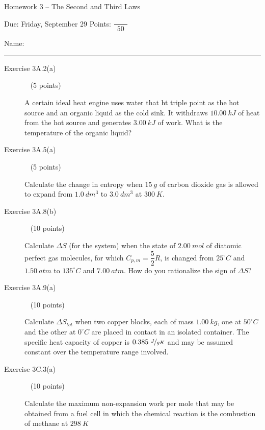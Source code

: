 \documentclass[12pt, openany, letterpaper]{memoir}
\begin{document}
\begin{center}
	{\large Homework 3 -- The Second and Third Laws}
	
	Due: Friday, September 29 \hspace{3em} Points: ${\dfrac{~}{~~50~~}}$
\end{center}

Name: \rule[-.1mm]{15em}{0.1pt}

\begin{description}	
	\item [Exercise 3A.2(a)] ~ (5 points)
	
	A certain ideal heat engine uses water that ht triple point as the hot source and an organic liquid as the cold sink. It withdraws $10.00~kJ$ of heat from the hot source and generates $3.00~kJ$ of work. What is the temperature of the organic liquid?
	
	\vspace{15em}
	\item [Exercise 3A.5(a)] ~ (5 points)
	
	Calculate the change in entropy when $15~g$ of carbon dioxide gas is allowed to expand from $1.0~dm^3$ to $3.0~dm^3$ at $300~K$.
	
	\vspace{15em}\newpage
	\item [Exercise 3A.8(b)] ~ (10 points)
	
	Calculate $\Delta S$ (for the system) when the state of $2.00~mol$ of diatomic perfect gas molecules, for which $C_{p,m}=\dfrac{5}{2}R$, is changed from $25^\circ C$ and $1.50~atm$ to $135^\circ C$ and $7.00~atm$. How do you rationalize the sign of $\Delta S$?
	
	\vspace{21em}

	\item [Exercise 3A.9(a)] ~ (10 points)
	
	Calculate $\Delta S_{tot}$ when two copper blocks, each of mass $1.00~kg$, one at $50^\circ C$ and the other at $0^\circ C$ are placed in contact in an isolated container. The specific heat capacity of copper is $0.385~\nicefrac{J}{gK}$ and may be assumed constant over the temperature range involved.
	
	\vspace{21em}
	
	\item [Exercise 3C.3(a)] ~ (10 points)
	
	Calculate the maximum non-expansion work per mole that may be obtained from a fuel cell in which the chemical reaction is the combustion of methane at $298~K$


\end{description}
\end{document}
